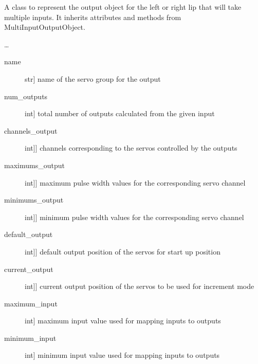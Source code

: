 \documentclass[letterpaper,10pt,english]{sphinxmanual}
\begin{document}
\begin{fulllineitems}
\label{\detokenize{specific:SideLipOutput.SideLipOutput}}
\sphinxAtStartPar
A class to represent the output object for the left or right lip that will take multiple inputs.
It inherits attributes and methods from MultiInputOutputObject.

\sphinxAtStartPar
…

\sphinxAtStartPar
{}
\begin{description}
\item[{name}] \leavevmode{[}str{]}
\sphinxAtStartPar
name of the servo group for the output

\item[{num\_outputs}] \leavevmode{[}int{]}
\sphinxAtStartPar
total number of outputs calculated from the given input

\item[{channels\_output}] \leavevmode{[}{[}int{]}{]}
\sphinxAtStartPar
channels corresponding to the servos controlled by the outputs

\item[{maximums\_output}] \leavevmode{[}{[}int{]}{]}
\sphinxAtStartPar
maximum pulse width values for the corresponding servo channel

\item[{minimums\_output}] \leavevmode{[}{[}int{]}{]}
\sphinxAtStartPar
minimum pulse width values for the corresponding servo channel

\item[{default\_output}] \leavevmode{[}{[}int{]}{]}
\sphinxAtStartPar
default output position of the servos for start up position

\item[{current\_output}] \leavevmode{[}{[}int{]}{]}
\sphinxAtStartPar
current output position of the servos to be used for increment mode

\item[{maximum\_input}] \leavevmode{[}int{]}
\sphinxAtStartPar
maximum input value used for mapping inputs to outputs

\item[{minimum\_input}] \leavevmode{[}int{]}
\sphinxAtStartPar
minimum input value used for mapping inputs to outputs


\end{description}
\end{fulllineitems}
\end{document}
